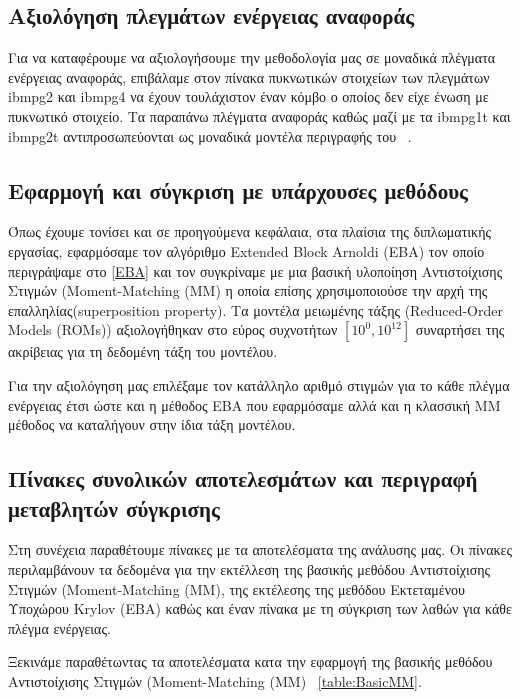 \subsection{Αξιολόγηση πλεγμάτων ενέργειας αναφοράς}
Για να καταφέρουμε να αξιολογήσουμε την μεθοδολογία μας σε μοναδικά πλέγματα ενέργειας αναφοράς, επιβάλαμε στον πίνακα πυκνωτικών στοιχείων των πλεγμάτων \textlatin{ibmpg2} και \textlatin{ibmpg4} να έχουν τουλάχιστον έναν κόμβο ο οποίος δεν είχε ένωση με πυκνωτικό στοιχείο. Τα παραπάνω πλέγματα αναφοράς καθώς μαζί με τα \textlatin{ibmpg1t} και \textlatin{ibmpg2t} αντιπροσωπεύονται ως μοναδικά μοντέλα περιγραφής του ~\cite{nassif2008power}. %


\subsection{Εφαρμογή και σύγκριση με υπάρχουσες μεθόδους}
Όπως έχουμε τονίσει και σε προηγούμενα κεφάλαια, στα πλαίσια της διπλωματικής εργασίας, εφαρμόσαμε τον αλγόριθμο \textlatin{Extended Block Arnoldi (EBA)} τον οποίο περιγράψαμε στο \ref{EBA} και τον συγκρίναμε με μια βασική υλοποίηση Αντιστοίχισης Στιγμών (\textlatin{Moment-Matching (MM)} η οποία επίσης χρησιμοποιούσε την αρχή της επαλληλίας(\textlatin{superposition property}). Τα μοντέλα μειωμένης τάξης (\textlatin{Reduced-Order Models (ROMs)}) αξιολογήθηκαν στο εύρος συχνοτήτων $[10^0, 10^{12}]$ συναρτήσει της ακρίβειας για τη δεδομένη τάξη του μοντέλου.

Για την αξιολόγηση μας επιλέξαμε τον κατάλληλο αριθμό στιγμών για το κάθε πλέγμα ενέργειας έτσι ώστε και η μέθοδος \textlatin{EBA} που εφαρμόσαμε αλλά και η κλασσική \textlatin{MM} μέθοδος να καταλήγουν στην ίδια τάξη μοντέλου.


\subsection{Πίνακες συνολικών αποτελεσμάτων και περιγραφή μεταβλητών σύγκρισης}

Στη συνέχεια παραθέτουμε πίνακες με τα αποτελέσματα της ανάλυσης μας. Οι πίνακες περιλαμβάνουν τα δεδομένα για την εκτέλλεση της βασικής μεθόδου Αντιστοίχισης Στιγμών (\textlatin{Moment-Matching (MM)}, της εκτέλεσης της μεθόδου Εκτεταμένου Υποχώρου \textlatin{Krylov} (\textlatin{EBA}) καθώς και έναν πίνακα με τη σύγκριση των λαθών για κάθε πλέγμα ενέργειας.

Ξεκινάμε παραθέτωντας τα αποτελέσματα κατα την εφαρμογή της βασικής μεθόδου Αντιστοίχισης Στιγμών (\textlatin{Moment-Matching (MM)} ~\ref{table:BasicMM}.

